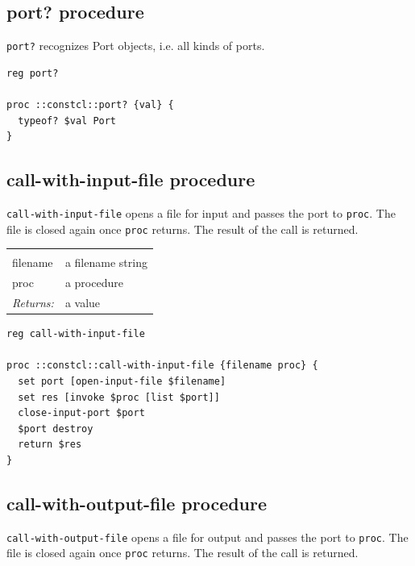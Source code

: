 \documentclass[a5paper,draft]{memoir}
\begin{document}
\subsection{port? procedure}
\label{port-procedure}

\texttt{port?} recognizes Port objects, i.e. all kinds of ports.

\begin{lstlisting}
reg port?

proc ::constcl::port? {val} {
  typeof? $val Port
}
\end{lstlisting}

\subsection{call-with-input-file procedure}
\label{callwithinputfile-procedure}

\texttt{call-with-input-file} opens a file for input and passes the port to \texttt{proc}. The file is closed again once \texttt{proc} returns. The result of the call is returned.

\noindent\begin{tabular}{ |p{1.9cm} p{6.5cm}| }
\hline
\rowcolor[HTML]{CCCCCC} \multicolumn{2}{|l|}{\textbf{call-with-input-file (public)}} \\
filename & a filename string \\
proc & a procedure \\
\textit{Returns:} & a value \\
\hline
\end{tabular}

\begin{lstlisting}
reg call-with-input-file

proc ::constcl::call-with-input-file {filename proc} {
  set port [open-input-file $filename]
  set res [invoke $proc [list $port]]
  close-input-port $port
  $port destroy
  return $res
}
\end{lstlisting}

\subsection{call-with-output-file procedure}
\label{callwithoutputfile-procedure}

\texttt{call-with-output-file} opens a file for output and passes the port to \texttt{proc}. The file is closed again once \texttt{proc} returns. The result of the call is returned.
\end{document}
